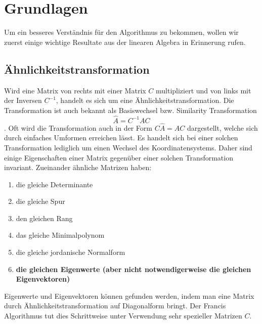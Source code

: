 \section{Grundlagen\label{francis:section:grundlagen}}
Um ein besseres Verständnis für den Algorithmus zu bekommen, wollen wir zuerst einige wichtige Resultate aus der linearen Algebra in Erinnerung rufen.

\subsection{Ähnlichkeitstransformation\label{francis:section:grundlagen:aehnlichkeitstransform}}
Wird eine Matrix von rechts mit einer Matrix $C$ multipliziert und von links mit der Inversen $C^{-1}$, handelt es sich um eine Ähnlichkeitstransformation. Die Transformation ist auch bekannt als Basiswechsel bzw. Similarity Transformation
\begin{equation}
	\hat{A}=C^{-1}AC
\end{equation}.
Oft wird die Transformation auch in der Form $C\hat{A}=AC$ dargestellt, welche sich durch einfaches Umformen erreichen lässt.
Es handelt sich bei einer solchen Transformation lediglich um einen Wechsel des Koordinatensystems.
Daher sind einige Eigenschaften einer Matrix gegenüber einer solchen Transformation invariant.
Zueinander ähnliche Matrizen haben:
\begin{enumerate}
	\item die gleiche Determinante
	\item die gleiche Spur
	\item den gleichen Rang
	\item das gleiche Minimalpolynom
	\item die gleiche jordanische Normalform
	\item \textbf{die gleichen Eigenwerte (aber nicht notwendigerweise die gleichen Eigenvektoren)}
\end{enumerate}

Eigenwerte und Eigenvektoren können gefunden werden, indem man eine Matrix durch Ähnlichkeitstransformation auf Diagonalform bringt.
Der Francis Algorithmus tut dies Schrittweise unter Verwendung sehr spezieller Matrizen $C$.

